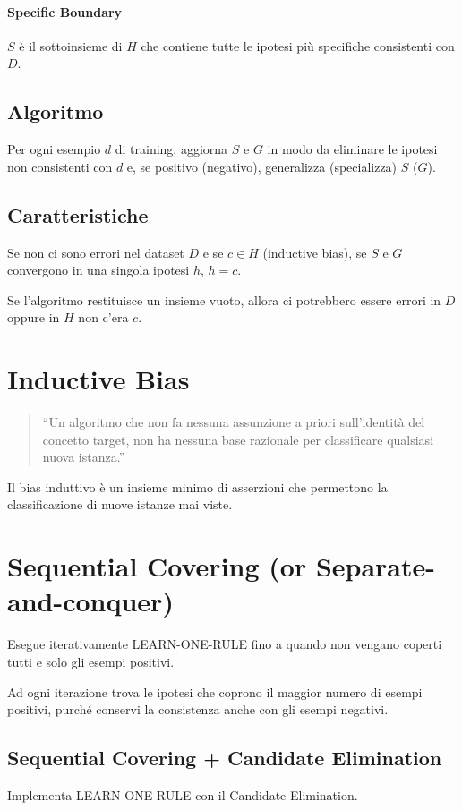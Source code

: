 \documentclass[11pt,onecolumn,a4paper,oneside]{book}
\begin{document}
		\paragraph{Specific Boundary} $S$ è il sottoinsieme di $H$ che contiene tutte le ipotesi	 più specifiche consistenti con $D$.

	\subsection*{Algoritmo}
		Per ogni esempio $d$ di training, aggiorna $S$ e $G$ in modo da eliminare le ipotesi non consistenti con $d$ e, se positivo (negativo), generalizza (specializza) $S$ ($G$).
	
	\subsection*{Caratteristiche}
	Se non ci sono errori nel dataset $D$ e se $c \in H$ (inductive bias), se $S$ e $G$ convergono in una singola ipotesi $h$, $h=c$.
	
	Se l'algoritmo restituisce un insieme vuoto, allora ci potrebbero essere errori in $D$ oppure in $H$ non c'era $c$.
	
	\section{Inductive Bias}

\begin{quote}
``Un algoritmo che non fa nessuna assunzione a priori sull'identità del concetto target, non ha nessuna base razionale per classificare qualsiasi nuova istanza.''
\end{quote}

Il bias induttivo è un insieme minimo di asserzioni che permettono la classificazione di nuove istanze mai viste.

	\section{Sequential Covering {\small (or Separate-and-conquer)}}
	
	Esegue iterativamente LEARN-ONE-RULE fino a quando non vengano coperti tutti e solo gli esempi positivi.
	
	Ad ogni iterazione trova le ipotesi che coprono il maggior numero di esempi positivi, purché conservi la consistenza anche con gli esempi negativi.

	\subsection{Sequential Covering + Candidate Elimination}
	Implementa LEARN-ONE-RULE con il Candidate Elimination.
	
\end{document}
